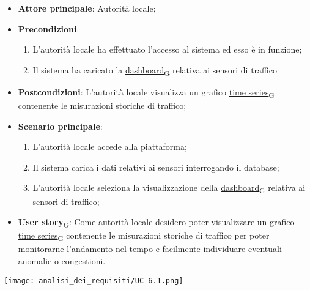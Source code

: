 \begin{itemize}
	\item \textbf{Attore principale}: Autorità locale;
	\item \textbf{Precondizioni}:
	      \begin{enumerate}
		      \item L'autorità locale ha effettuato l'accesso al sistema ed esso è in funzione;
		      \item Il sistema ha caricato la \href{https://7last.github.io/docs/rtb/documentazione-interna/glossario\#dashboard}{dashboard\textsubscript{G}} relativa ai sensori di traffico
	      \end{enumerate}
	\item \textbf{Postcondizioni}: L'autorità locale visualizza un grafico \href{https://7last.github.io/docs/rtb/documentazione-interna/glossario\#time-series}{time series\textsubscript{G}} contenente le misurazioni storiche
	      di traffico;
	\item \textbf{Scenario principale}:
	      \begin{enumerate}
		      \item L'autorità locale accede alla piattaforma;
		      \item Il sistema carica i dati relativi ai sensori interrogando il database;
		      \item L'autorità locale seleziona la visualizzazione della \href{https://7last.github.io/docs/rtb/documentazione-interna/glossario\#dashboard}{dashboard\textsubscript{G}} relativa ai sensori di traffico;
	      \end{enumerate}
	\item \href{https://7last.github.io/docs/rtb/documentazione-interna/glossario\#user-story}{\textbf{User story}\textsubscript{G}}:
	      Come autorità locale desidero poter visualizzare un grafico \href{https://7last.github.io/docs/rtb/documentazione-interna/glossario\#time-series}{time series\textsubscript{G}} contenente le misurazioni storiche
	      di traffico per poter monitorarne l'andamento nel tempo e facilmente individuare eventuali anomalie
	      o congestioni.
\end{itemize}
\begin{center}
	\texttt{[image: analisi\_dei\_requisiti/UC-6.1.png]}
\end{center}

